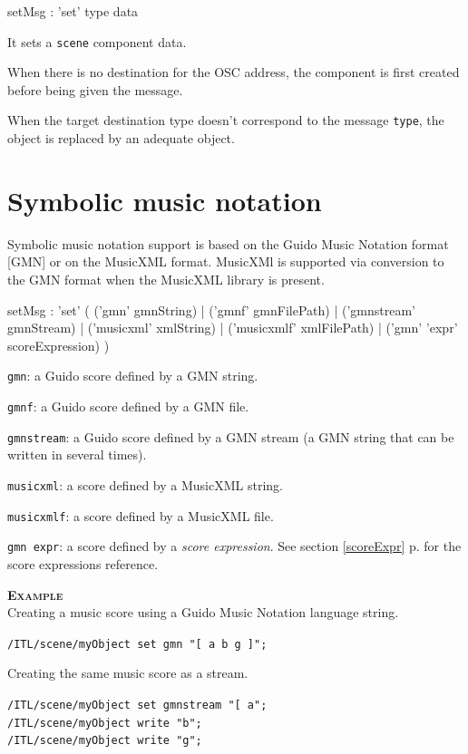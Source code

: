 \documentclass[a4paper,twoside]{report}
\newcommand{\sublevel}[1]	{\section{#1}}
\newcommand{\fullref}[1]	{\ref{#1} p.\pageref{#1}}
\newcommand{\OSC}[1]		{\texttt{#1}}
\newcommand{\example}		{\textbf{\hspace{-1.5cm}\textbf{\textsc{Example }}}}
\let\olditemize\itemize
\let\oldenditemize\enditemize
\renewenvironment{itemize} 	{\olditemize \setlength{\itemsep}{1mm}}{\oldenditemize}
\newcommand{\sample}	[1]			{\vspace{-2mm}\begin{center}\colorbox{mygrey}{
								\begin{minipage}[t]{0.9\columnwidth} 
								{\small \texttt{#1}}
								\end{minipage}}\end{center}}
\begin{document}
\begin{rail}
setMsg : 'set' type data
\end{rail}

It sets a \OSC{scene} component data. 

When there is no destination for the OSC address, the component is first created before being given the message. 

When the target destination type doesn't correspond to the message \OSC{type}, the object is replaced by an adequate object.

\sublevel{Symbolic music notation}
\label{symscore}

Symbolic music notation support is based on the Guido Music Notation format [GMN] or on the MusicXML format. MusicXMl is supported via conversion to the GMN format when the MusicXML library is present.

\begin{rail}
setMsg : 'set' (
	('gmn' gmnString) |
	('gmnf' gmnFilePath) |
	('gmnstream' gmnStream) |
	('musicxml' xmlString) |
	('musicxmlf' xmlFilePath) |
	('gmn' 'expr' scoreExpression)
)
\end{rail}

\begin{itemize}
\item \OSC{gmn}: a Guido score defined by a GMN string.
\item \OSC{gmnf}: a Guido score defined by a GMN file.
\item \OSC{gmnstream}: a Guido score defined by a GMN stream (a GMN string that can be written in several times).
\item \OSC{musicxml}: a score defined by a MusicXML string.
\item \OSC{musicxmlf}: a score defined by a MusicXML file.
\item \OSC{gmn expr}: a score defined by a \emph{score expression}. See section \fullref{scoreExpr} for the score expressions reference.
\end{itemize}

\example \\
Creating a music score using a Guido Music Notation language string.
\sample{/ITL/scene/myObject set gmn "[ a b g ]";}
Creating the same music score as a stream.
\sample{/ITL/scene/myObject set gmnstream "[ a";\\
/ITL/scene/myObject write "b";\\
/ITL/scene/myObject write "g";
}
\end{document}
